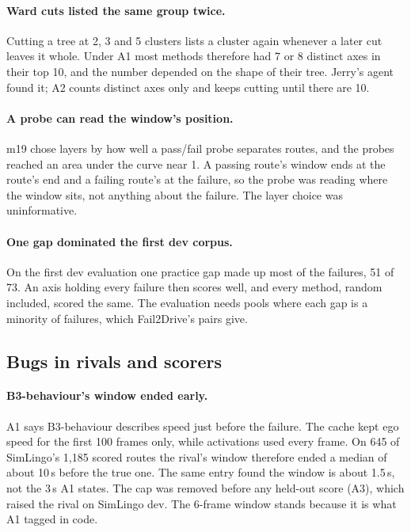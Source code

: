 \paragraph{Ward cuts listed the same group twice.}
Cutting a tree at 2, 3 and 5 clusters lists a cluster again whenever a later cut
leaves it whole. Under A1 most methods therefore had 7 or 8 distinct axes in
their top 10, and the number depended on the shape of their tree. Jerry's agent
found it; A2 counts distinct axes only and keeps cutting until there are 10.

\paragraph{A probe can read the window's position.}
m19 chose layers by how well a pass/fail probe separates routes, and the probes
reached an area under the curve near 1.
A passing route's window ends at the route's end and a failing route's at the
failure, so the probe was reading where the window sits, not anything about the
failure. The layer choice was uninformative.

\paragraph{One gap dominated the first dev corpus.}
On the first dev evaluation one practice gap made up most of the failures,
51 of 73. An axis holding every failure then scores well, and every method,
random included, scored the same. The evaluation needs pools where each gap is
a minority of failures, which Fail2Drive's pairs give.

\subsection{Bugs in rivals and scorers}

\paragraph{B3-behaviour's window ended early.}
A1 says B3-behaviour describes speed just before the failure. The cache kept
ego speed for the first 100 frames only, while activations used every frame.
On 645 of SimLingo's 1,185 scored routes the rival's window therefore ended a
median of about 10\,s before the true one. The same entry found the window is
about 1.5\,s, not the 3\,s A1 states. The cap was removed before any held-out
score (A3), which raised the rival on SimLingo dev. The 6-frame window stands because
it is what A1 tagged in code.


